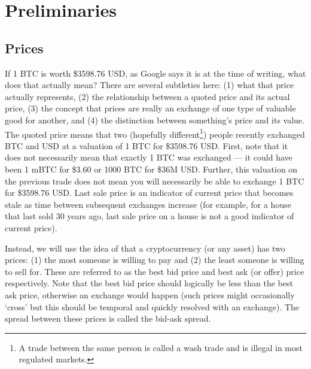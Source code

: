 



\section{Preliminaries}

\subsection{Prices}

If 1 BTC is worth \$3598.76 USD, as Google says it is at the time of writing, what does that actually mean? There are several subtleties here: (1) what that price actually represents, (2) the relationship between a quoted price and its actual price, (3) the concept that prices are really an exchange of one type of valuable good for another, and (4) the distinction between something's price and its value. The quoted price means that two (hopefully different\footnote{A trade between the same person is called a wash trade and is illegal in most regulated markets.}) people recently exchanged BTC and USD at a valuation of 1 BTC for \$3598.76 USD. First, note that it does not necessarily mean that exactly 1 BTC was exchanged --- it could have been 1 mBTC for \$3.60 or 1000 BTC for \$36M USD. Further, this valuation on the previous trade does not mean you will necessarily be able to exchange 1 BTC for \$3598.76 USD. Last sale price is an indicator of current price that becomes stale as time between subsequent exchanges increase (for example, for a house that last sold 30 years ago, last sale price on a house is not a good indicator of current price).

Instead, we will use the idea of that a cryptocurrency (or any asset) has two prices: (1) the most someone is willing to pay and (2) the least someone is willing to sell for. These are referred to as the best bid price and best ask (or offer) price respectively. Note that the best bid price should logically be less than the best ask price, otherwise an exchange would happen (such prices might occasionally `cross' but this should be temporal and quickly resolved with an exchange). The spread between these prices is called the bid-ask spread.

